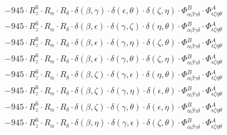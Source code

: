 \documentclass{article}
\begin{document}
\begin{equation}
\begin{array}{c}
 \\[0.2em] 		 - 945 \cdot R_{z}^{6} \cdot R_{\alpha{}} \cdot R_{\delta{}} \cdot \delta{}\left(\beta{}, \gamma{}\right) \cdot \delta{}\left(\epsilon{}, \theta{}\right) \cdot \delta{}\left(\zeta{}, \eta{}\right) \cdot \Phi{}^{B}_{\alpha{}\beta{}\gamma{}\delta{}} \cdot \Phi{}^{A}_{\epsilon{}\zeta{}\eta{}\theta{}} 
 \\[0.2em] 		 - 945 \cdot R_{z}^{6} \cdot R_{\alpha{}} \cdot R_{\delta{}} \cdot \delta{}\left(\beta{}, \epsilon{}\right) \cdot \delta{}\left(\gamma{}, \zeta{}\right) \cdot \delta{}\left(\eta{}, \theta{}\right) \cdot \Phi{}^{B}_{\alpha{}\beta{}\gamma{}\delta{}} \cdot \Phi{}^{A}_{\epsilon{}\zeta{}\eta{}\theta{}} 
 \\[0.2em] 		 - 945 \cdot R_{z}^{6} \cdot R_{\alpha{}} \cdot R_{\delta{}} \cdot \delta{}\left(\beta{}, \epsilon{}\right) \cdot \delta{}\left(\gamma{}, \eta{}\right) \cdot \delta{}\left(\zeta{}, \theta{}\right) \cdot \Phi{}^{B}_{\alpha{}\beta{}\gamma{}\delta{}} \cdot \Phi{}^{A}_{\epsilon{}\zeta{}\eta{}\theta{}} 
 \\[0.2em] 		 - 945 \cdot R_{z}^{6} \cdot R_{\alpha{}} \cdot R_{\delta{}} \cdot \delta{}\left(\beta{}, \epsilon{}\right) \cdot \delta{}\left(\gamma{}, \theta{}\right) \cdot \delta{}\left(\zeta{}, \eta{}\right) \cdot \Phi{}^{B}_{\alpha{}\beta{}\gamma{}\delta{}} \cdot \Phi{}^{A}_{\epsilon{}\zeta{}\eta{}\theta{}} 
 \\[0.2em] 		 - 945 \cdot R_{z}^{6} \cdot R_{\alpha{}} \cdot R_{\delta{}} \cdot \delta{}\left(\beta{}, \zeta{}\right) \cdot \delta{}\left(\gamma{}, \epsilon{}\right) \cdot \delta{}\left(\eta{}, \theta{}\right) \cdot \Phi{}^{B}_{\alpha{}\beta{}\gamma{}\delta{}} \cdot \Phi{}^{A}_{\epsilon{}\zeta{}\eta{}\theta{}} 
 \\[0.2em] 		 - 945 \cdot R_{z}^{6} \cdot R_{\alpha{}} \cdot R_{\delta{}} \cdot \delta{}\left(\beta{}, \zeta{}\right) \cdot \delta{}\left(\gamma{}, \eta{}\right) \cdot \delta{}\left(\epsilon{}, \theta{}\right) \cdot \Phi{}^{B}_{\alpha{}\beta{}\gamma{}\delta{}} \cdot \Phi{}^{A}_{\epsilon{}\zeta{}\eta{}\theta{}} 
 \\[0.2em] 		 - 945 \cdot R_{z}^{6} \cdot R_{\alpha{}} \cdot R_{\delta{}} \cdot \delta{}\left(\beta{}, \zeta{}\right) \cdot \delta{}\left(\gamma{}, \theta{}\right) \cdot \delta{}\left(\epsilon{}, \eta{}\right) \cdot \Phi{}^{B}_{\alpha{}\beta{}\gamma{}\delta{}} \cdot \Phi{}^{A}_{\epsilon{}\zeta{}\eta{}\theta{}} 
 \\[0.2em] 		 - 945 \cdot R_{z}^{6} \cdot R_{\alpha{}} \cdot R_{\delta{}} \cdot \delta{}\left(\beta{}, \eta{}\right) \cdot \delta{}\left(\gamma{}, \epsilon{}\right) \cdot \delta{}\left(\zeta{}, \theta{}\right) \cdot \Phi{}^{B}_{\alpha{}\beta{}\gamma{}\delta{}} \cdot \Phi{}^{A}_{\epsilon{}\zeta{}\eta{}\theta{}} 

\end{array}
\end{equation}
\end{document}
